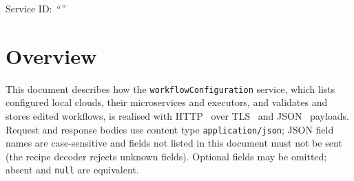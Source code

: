 \documentclass[a4paper]{arrowhead}
\begin{document}
\ArrowheadSetup

\begin{center}
  \vspace*{1cm}
  \huge{\arrowtitle}

  \vspace*{0.2cm}
  \LARGE{\arrowtype}
  \vspace*{1cm}

  \Large{Service ID: \textit{``\arrowid''}}
  \vspace*{\fill}

  

  \vspace*{1cm}
  \vspace*{\fill}

  \begin{abstract}
    This document describes the HTTP/TLS/JSON interface of the \texttt{workflowConfiguration} service of the Eclipse Arrowhead workflow support systems, service version 1.0.0, documentation edition 5.4.0. It realises the abstract operations of the \texttt{workflowConfiguration} SD.
  \end{abstract}

  \vspace*{1cm}
\end{center}

\newpage

\tableofcontents
\newpage

\section{Overview}
\label{sec:overview}
This document describes how the \texttt{workflowConfiguration} service, which lists configured local clouds, their microservices and executors, and validates and stores edited workflows, is realised with HTTP~\cite{rfc9110}
over TLS~\cite{rfc8446} and JSON~\cite{rfc8259} payloads. Request and response bodies use content type
\texttt{application/json}; JSON field names are case-sensitive and fields not listed in this document must not be sent
(the recipe decoder rejects unknown fields). Optional fields may be omitted; absent and \texttt{null} are equivalent.
\end{document}
